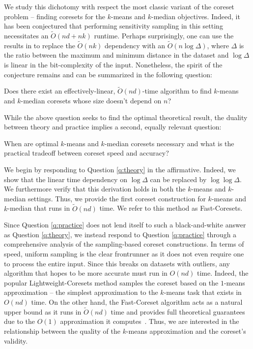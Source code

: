 We study this dichotomy with respect the most classic variant of the coreset problem -- finding coresets for the $k$-means and $k$-median objectives.
Indeed, it has been conjectured that performing sensitivity sampling in this setting necessitates an $\tilde{O}(nd + nk)$ runtime.
Perhaps surprisingly, one can use the results in \cite{cohen2020fast} to replace the $\tilde{O}(nk)$ dependency with an $\tilde{O}(n \log \Delta)$, where $\Delta$ is the ratio
between the maximum and minimum distance in the dataset and $\log \Delta$ is linear in the bit-complexity of the input. Nonetheless, the spirit of the conjecture remains and
can be summarized in the following question:
\begin{question}
\label{q:theory}
Does there exist an effectively-linear, $\tilde{O}(nd)$-time algorithm to find $k$-means and $k$-median coresets whose size doesn't depend on $n$?
\end{question}
While the above question seeks to find the optimal theoretical result, the duality between theory and practice implies a second, equally relevant question:
\begin{question}
\label{q:practice}
When are optimal $k$-means and $k$-median coresets necessary and what is the practical tradeoff between coreset speed and accuracy?
\end{question}

We begin by responding to Question \ref{q:theory} in the affirmative. Indeed, we show that the linear time dependency on $\log \Delta$ can be replaced by $\log
\log \Delta$. We furthermore verify that this derivation holds in both the $k$-means and $k$-median settings. Thus,
we provide the first coreset construction for $k$-means and $k$-median that runs in $\tilde{O}(nd)$ time. We refer to this method as Fast-Coresets.

Since Question \ref{q:practice} does not lend itself to such a black-and-white answer as Question \ref{q:theory}, we instead respond to Question
\ref{q:practice} through a comprehensive analysis of the sampling-based coreset constructions.
In terms of speed, uniform sampling is the clear frontrunner as it does not even require one to process the entire input.
Since this breaks on datasets with outliers, any algorithm that hopes to be more accurate must run in $O(nd)$ time.
Indeed, the popular Lightweight-Coresets method samples the coreset based on the $1$-means approximation
-- the simplest approximation to the $k$-means task that exists in $O(nd)$ time. On the other hand, the Fast-Coreset algorithm acts as a natural upper bound as
it runs in $\tilde{O}(nd)$ time and provides full theoretical guarantees due to the $O(1)$ approximation it computes~\cite{MakarychevMSW16}. Thus, we are
interested in the relationship between the quality of the $k$-means approximation and the coreset's validity.

